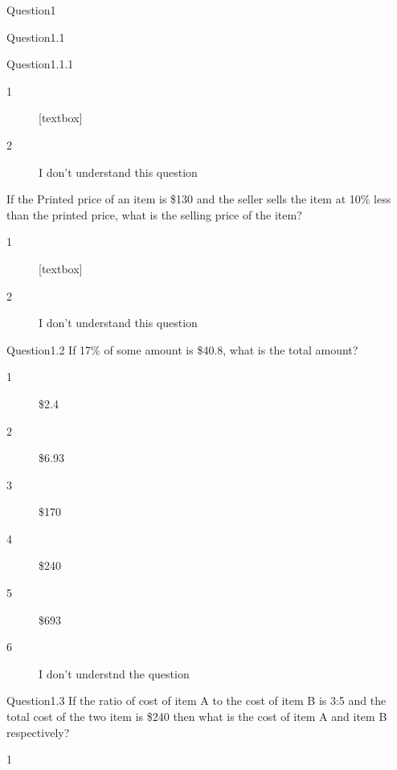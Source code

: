 \documentclass[titlepage]{article}
\begin{document}
\begin{section}{Question1}
\begin{subsection}{Question1.1}
\begin{subsubsection}{Question1.1.1}
		\begin{description}
		\item[1]
			[textbox]
		\item[2]
			I don't understand this question
		\end{description}						
\end{subsubsection}
\begin{subsubsection}
If the Printed price of an item is \$130 and the seller sells the item at 10\% less than the printed price, what is the selling price of the item?
		\begin{description}
		\item[1]
			[textbox]
		\item[2]
			I don't understand this question	
		\end{description}		 
\end{subsubsection}
\end{subsection}
\begin{subsection}{Question1.2}
If 17\% of some amount is \$40.8, what is the total amount?
		\begin{description}
		\item[1]
			\$2.4
		\item[2]
			\$6.93
		\item[3]
			\$170
		\item[4]
			\$240
		\item[5]	
			\$693
		\item[6]
			I don't understnd the question
		\end{description}
\end{subsection}
\begin{subsection}{Question1.3}
If the ratio of cost of item A to the cost of item B is 3:5 and the total cost of the two item is \$240 then what is the cost of item A and item B respectively?
		\begin{description}
		\item[1]

\end{description}
\end{subsection}
\end{section}
\end{document}

